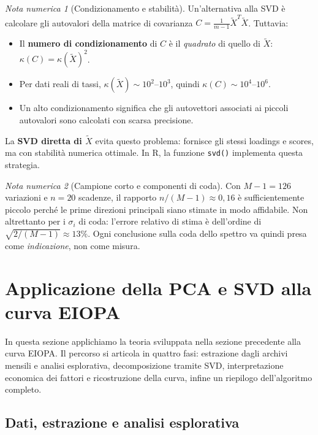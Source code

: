 \documentclass[11pt,a4paper]{article}
\theoremstyle{plain}
\theoremstyle{definition}
\theoremstyle{remark}
\newtheorem*{attenzione}{Nota numerica}
\begin{document}
\begin{attenzione}[Condizionamento e stabilità]
Un'alternativa alla SVD è calcolare gli autovalori della matrice di covarianza
$C = \frac{1}{m-1}\tilde{X}^T \tilde{X}$. Tuttavia:
\begin{itemize}
  \item Il \textbf{numero di condizionamento} di $C$ è il \emph{quadrato} di
        quello di $\tilde{X}$:
        $\kappa(C) = \kappa(\tilde{X})^2$.
  \item Per dati reali di tassi, $\kappa(\tilde{X}) \sim 10^2$--$10^3$, quindi
        $\kappa(C) \sim 10^4$--$10^6$.
  \item Un alto condizionamento significa che gli autovettori associati ai
        piccoli autovalori sono calcolati con scarsa precisione.
\end{itemize}
La \textbf{SVD diretta di $\tilde{X}$} evita questo problema: fornisce gli
stessi loadings e scores, ma con stabilità numerica ottimale. In R, la funzione
\texttt{svd()} implementa questa strategia.
\end{attenzione}

\begin{attenzione}[Campione corto e componenti di coda]
Con $M-1=126$ variazioni e $n=20$ scadenze, il rapporto $n/(M-1)\approx 0{,}16$
\`e sufficientemente piccolo perché le prime direzioni principali siano stimate
in modo affidabile. Non altrettanto per i $\sigma_i$ di coda: l'errore relativo
di stima \`e dell'ordine di $\sqrt{2/(M-1)}\approx 13\%$. Ogni conclusione sulla
coda dello spettro va quindi presa come \emph{indicazione}, non come misura.
\end{attenzione}

\section{Applicazione della PCA e SVD alla curva EIOPA}

In questa sezione applichiamo la teoria sviluppata nella sezione precedente alla
curva EIOPA. Il percorso si articola in quattro fasi: estrazione dagli archivi
mensili e analisi esplorativa, decomposizione tramite SVD, interpretazione
economica dei fattori e ricostruzione della curva, infine un riepilogo
dell'algoritmo completo.

\subsection{Dati, estrazione e analisi esplorativa}
\end{document}
